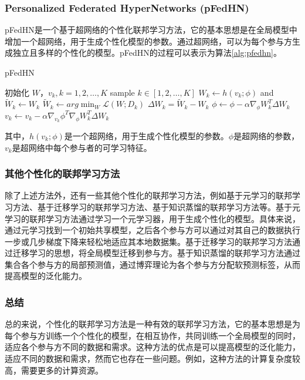 \subsubsection{Personalized Federated HyperNetworks (pFedHN)}

pFedHN\cite{shamsian2021personalized}是一个基于超网络的个性化联邦学习方法，它的基本思想是在全局模型中增加一个超网络，用于生成个性化模型的参数。通过超网络，可以为每个参与方生成独立且多样的个性化的模型。pFedHN的过程可以表示为算法\ref{alg:pfedhn}。

\begin{algorithm}[htbp]
\caption{pFedHN}
\label{alg:pfedhn}
\begin{algorithmic}[1]
    \State 初始化 $W$，$v_k,k=1,2,\dots,K$
        \State sample $k\in[1,2,\dots,K]$
        \State $W_k\leftarrow h(v_k;\phi)$ and $\tilde{W}_k\leftarrow W_k$
        \State $\tilde{W}_k \leftarrow arg\min_W \mathcal{L}(W;D_k)$
        \State $\Delta W_k=\tilde{W}_k-W_k$
        \State $\phi\leftarrow \phi-\alpha\nabla_\phi  W_k^T\Delta W_k$
        \State $v_k\leftarrow v_k-\alpha\nabla_{v_k}\phi^T\nabla_\phi W_k^T\Delta W_k$
    \EndFor
\end{algorithmic}
\end{algorithm}

其中，$h(v_k;\phi)$是一个超网络，用于生成个性化模型的参数。$\phi$是超网络的参数，$v_k$是超网络中每个参与者的可学习特征。

\subsubsection{其他个性化的联邦学习方法}

除了上述方法外，还有一些其他个性化的联邦学习方法，例如基于元学习的联邦学习方法\cite{fallah2020personalized}、基于迁移学习的联邦学习方法\cite{liu2020secure}、基于知识蒸馏的联邦学习方法\cite{zhu2021data}等。基于元学习的联邦学习方法通过学习一个元学习器，用于生成个性化的模型。具体来说，通过元学习找到一个初始共享模型，之后各个参与方可以通过对其自己的数据执行一步或几步梯度下降来轻松地适应其本地数据集。基于迁移学习的联邦学习方法通过迁移学习的思想，将全局模型迁移到参与方。基于知识蒸馏的联邦学习方法通过集合各个参与方的局部预测值，通过博弈理论为各个参与方分配软预测标签，从而提高模型的泛化能力。

\subsubsection{总结}

总的来说，个性化的联邦学习方法是一种有效的联邦学习方法，它的基本思想是为每个参与方训练一个个性化的模型，在相互协作，共同训练一个全局模型的同时，适应各个参与方不同的数据和需求。这种方法的优点是可以提高模型的泛化能力，适应不同的数据和需求，然而它也存在一些问题。例如，这种方法的计算复杂度较高，需要更多的计算资源。